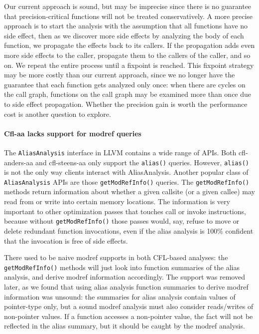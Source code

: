 \documentclass[10pt]{article}
\begin{document}
Our current approach is sound, but may be imprecise since there is no guarantee that precision-critical
functions will not be treated conservatively. A more precise approach is to start the
analysis with the assumption that all functions have no side effect, then as we
discover more side effects by analyzing the body of each function, we propagate
the effects back to its callers. If the propagation adds even more side effects
to the caller, propagate them to the callers of the caller, and so on. We repeat the entire process until a fixpoint
is reached. This fixpoint strategy may be more costly than our current approach,
since we no longer have
the guarantee that each function gets analyzed only once: when there are
cycles on the call graph, functions on the call graph may be examined more than
once due to side effect propagation. Whether the precision gain is worth the
performance cost is another question to explore.

\paragraph{Cfl-aa lacks support for modref queries}

The \texttt{AliasAnalysis} interface in LLVM contains a wide range of APIs. Both
cfl-anders-aa and cfl-steens-aa only support the \texttt{alias()} queries.
However, \texttt{alias()} is not the only way clients interact with
AliasAnalysis. Another popular class of \texttt{AliasAnalysis} APIs are those
\texttt{getModRefInfo()} queries. The \texttt{getModRefInfo()} methods return
information about whether a given callsite (or a given callee) may read from or
write into certain memory locations. The information is very important to other
optimization passes that touches call or invoke instructions, because without
\texttt{getModRefInfo()} those passes would, say, refuse to move or delete
redundant function invocations, even if the alias analysis is 100\% confident
that the invocation is free of side effects.

There used to be naive modref supports in both CFL-based analyses: the
\texttt{getModRefInfo()} methods will just look into function summaries of the
alias analysis, and derive modref information accordingly. The support was
removed later, as we found that using alias analysis function summaries to derive modref information was
unsound: the summaries for alias analysis contain values of pointer-type
only, but a sound modref analysis must also consider reads/writes of non-pointer values. If a
function accesses a non-pointer value, the fact will not be reflected in the
alias summary, but it should be caught by the modref analysis.
\end{document}

